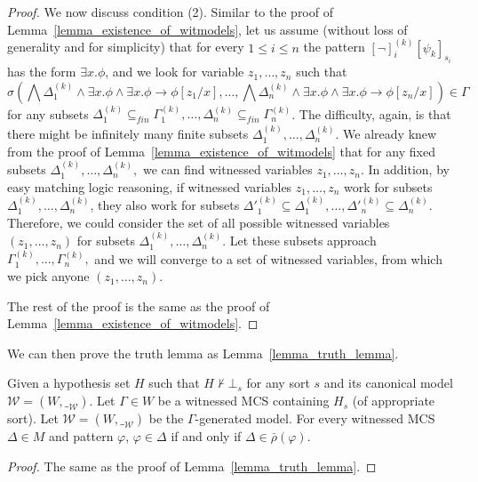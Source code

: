 \documentclass[acmsmall]{acmart}
\makeatletter
\theoremstyle{acmdefinition}
\newcommand{\imp}{\to}
\newcommand{\WW}{\mathcal{W}}
\newcommand{\interp}[1]{\__{#1}}
\newcommand{\barrho}{\bar{\rho}}
\newcommand{\ddd}{,\dots,}
\newcommand{\fin}{\mathit{fin}}
\newcommand{\Rmnum}[1]{\expandafter\@slowromancap\romannumeral #1@}
\makeatother
\begin{document}
\begin{proof}
We now discuss condition (2). 
Similar to the proof of
Lemma~\ref{lemma_existence_of_witmodels},
let us assume (without loss of generality and for simplicity) 
that for every $1 \le i \le n$
the pattern $[\neg]_i^{(k)}[\psi_k]_{s_i}$
has the form $\exists x . \phi$,
and we look for variable $z_1 \ddd z_n$ such that
$$
\sigma(\bigwedge \Delta_1^{(k)} \wedge \exists x . \phi 
                                \wedge \exists x . \phi \imp \phi[z_1/x]
  \ddd \bigwedge \Delta_n^{(k)} \wedge \exists x . \phi
                                \wedge \exists x . \phi \imp \phi[z_n/x])
\in \Gamma
$$
for any subsets 
$\Delta_1^{(k)} \subseteq_\fin \Gamma_1^{(k)}
 \ddd 
 \Delta_n^{(k)} \subseteq_\fin \Gamma_n^{(k)}
$.
The difficulty, again, is that there might be infinitely many
finite subsets $\Delta_1^{(k)} \ddd \Delta_n^{(k)}$.
We already knew from the proof of 
Lemma~\ref{lemma_existence_of_witmodels}
that for any fixed subsets
$\Delta_1^{(k)} 
 \ddd 
 \Delta_n^{(k)},
$
we can find witnessed variables $z_1 \ddd z_n$.
In addition, by easy matching logic reasoning,
if witnessed variables $z_1 \ddd z_n$
work for subsets  
$\Delta_1^{(k)} 
 \ddd 
 \Delta_n^{(k)}
$,
they also work for subsets
${\Delta'}_1^{(k)} \subseteq \Delta_1^{(k)} 
 \ddd 
 {\Delta'}_n^{(k)} \subseteq \Delta_n^{(k)}
$.
Therefore,
we could consider the set of all possible
witnessed variables
$(z_1 \ddd z_n)$ for subsets 
$\Delta_1^{(k)} 
 \ddd 
 \Delta_n^{(k)}
$.
Let these subsets approach
$\Gamma_1^{(k)} 
 \ddd 
 \Gamma_n^{(k)},
$
and we will converge to a set of witnessed variables,
from which we pick anyone $(z_1 \ddd z_n)$.

The rest of the proof is the same as the proof of 
Lemma~\ref{lemma_existence_of_witmodels}.
\end{proof}

We can then prove the truth lemma as Lemma~\ref{lemma_truth_lemma}.
\begin{lemma}[Truth Lemma \Rmnum{2}]
\label{lemma_truth_lemma_two}
Given a hypothesis set $H$ 
such that $H \not\vdash \bot_s$ for any sort $s$
and its canonical model $\WW = (W,\__\WW)$.
Let $\Gamma \in W$ be a witnessed MCS containing $H_s$
(of appropriate sort).
Let $\WW = (W, \interp{\WW})$ be the $\Gamma$-generated model.
For every witnessed MCS $\Delta \in M$ and pattern $\varphi$,
$\varphi \in \Delta$ if and only if $\Delta \in \barrho(\varphi)$.
\end{lemma}
\begin{proof}
The same as the proof of Lemma~\ref{lemma_truth_lemma}.
\end{proof}
\end{document}
